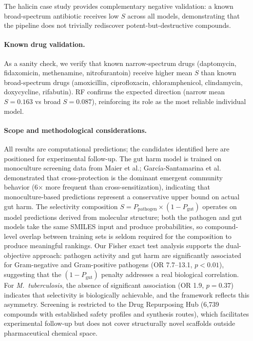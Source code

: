 \documentclass{article}
\newcommand{\pp}{P_{\mathrm{pathogen}}}
\newcommand{\pg}{P_{\mathrm{gut}}}
\begin{document}
The halicin case study provides complementary negative validation: a known broad-spectrum antibiotic receives low $S$ across all models, demonstrating that the pipeline does not trivially rediscover potent-but-destructive compounds.

\paragraph{Known drug validation.}
As a sanity check, we verify that known narrow-spectrum drugs (daptomycin, fidaxomicin, methenamine, nitrofurantoin) receive higher mean $S$ than known broad-spectrum drugs (amoxicillin, ciprofloxacin, chloramphenicol, clindamycin, doxycycline, rifabutin).
RF confirms the expected direction (narrow mean $S = 0.163$ vs broad $S = 0.087$), reinforcing its role as the most reliable individual model.

\paragraph{Scope and methodological considerations.}
All results are computational predictions; the candidates identified here are positioned for experimental follow-up.
The gut harm model is trained on monoculture screening data from Maier et al.; Garc\'{i}a-Santamarina et al.~\citep{garcia2024} demonstrated that cross-protection is the dominant emergent community behavior (6$\times$ more frequent than cross-sensitization), indicating that monoculture-based predictions represent a conservative upper bound on actual gut harm.
The selectivity composition $S = \pp \times (1 - \pg)$ operates on model predictions derived from molecular structure; both the pathogen and gut models take the same SMILES input and produce probabilities, so compound-level overlap between training sets is seldom required for the composition to produce meaningful rankings.
Our Fisher exact test analysis supports the dual-objective approach: pathogen activity and gut harm are significantly associated for Gram-negative and Gram-positive pathogens (OR 7.7--13.1, $p < 0.01$), suggesting that the $(1 - \pg)$ penalty addresses a real biological correlation.
For \textit{M.~tuberculosis}, the absence of significant association (OR 1.9, $p = 0.37$) indicates that selectivity is biologically achievable, and the framework reflects this asymmetry.
Screening is restricted to the Drug Repurposing Hub (6,739 compounds with established safety profiles and synthesis routes), which facilitates experimental follow-up but does not cover structurally novel scaffolds outside pharmaceutical chemical space.
\end{document}
